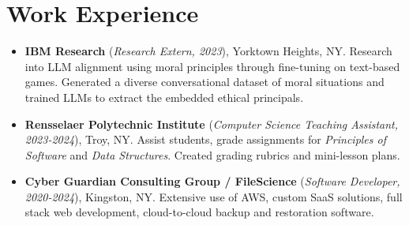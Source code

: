 \documentclass[11pt]{article}
\begin{document}
\section*{Work Experience}
\begin{itemize}
    \itemsep0em 

    \item \textbf{IBM Research} (\textit{Research Extern, 2023}), Yorktown Heights, NY. Research into LLM alignment using moral principles through fine-tuning on text-based games. Generated a diverse conversational dataset of moral situations and trained LLMs to extract the embedded ethical principals.
    
    \item \textbf{Rensselaer Polytechnic Institute} (\textit{Computer Science Teaching Assistant, 2023-2024}), Troy, NY. Assist students, grade assignments for \textit{Principles of Software} and \textit{Data Structures}. Created grading rubrics and mini-lesson plans.
    
    \item \textbf{Cyber Guardian Consulting Group / FileScience} (\textit{Software Developer, 2020-2024}), Kingston, NY. Extensive use of AWS, custom SaaS solutions, full stack web development, cloud-to-cloud backup and restoration software.

\end{itemize}
\end{document}
